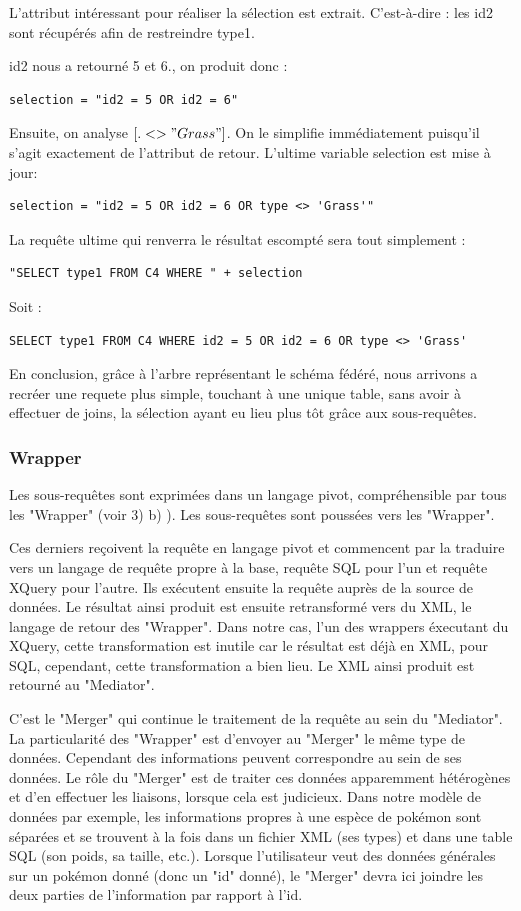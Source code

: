 L'attribut intéressant pour réaliser la sélection est extrait. C'est-à-dire : les id2 sont récupérés afin de restreindre type1.

id2 nous a retourné 5 et 6., on produit donc :
\begin{lstlisting}
selection = "id2 = 5 OR id2 = 6"
\end{lstlisting}

Ensuite, on analyse $[. <> "Grass"]$. On le simplifie immédiatement puisqu'il s'agit exactement de l'attribut de retour. L'ultime variable selection est mise à jour:
\begin{lstlisting}
selection = "id2 = 5 OR id2 = 6 OR type <> 'Grass'"
\end{lstlisting}
La requête ultime qui renverra le résultat escompté sera tout simplement :
\begin{lstlisting}
"SELECT type1 FROM C4 WHERE " + selection
\end{lstlisting}
Soit :
\begin{lstlisting}
SELECT type1 FROM C4 WHERE id2 = 5 OR id2 = 6 OR type <> 'Grass'
\end{lstlisting}
En conclusion, grâce à l'arbre représentant le schéma fédéré, nous arrivons a recréer une requete plus simple, touchant à une unique table,  sans avoir à effectuer de joins, la sélection ayant eu lieu plus tôt grâce aux sous-requêtes.

\subsubsection{Wrapper}

Les sous-requêtes sont exprimées dans un langage pivot, compréhensible par tous les "Wrapper" (voir 3) b) ). Les sous-requêtes sont poussées vers les "Wrapper".

Ces derniers reçoivent la requête en langage pivot et commencent par la traduire vers un langage de requête propre à la base, requête SQL pour l'un et requête XQuery pour l'autre. Ils exécutent ensuite la requête auprès de la source de données. Le résultat ainsi produit est ensuite retransformé vers du XML, le langage de retour des "Wrapper". Dans notre cas, l'un des wrappers éxecutant du XQuery, cette transformation est inutile car le résultat est déjà en XML, pour SQL, cependant, cette transformation a bien lieu. Le XML ainsi produit est retourné au "Mediator".

C'est le "Merger" qui continue le traitement de la requête au sein du "Mediator". La particularité des "Wrapper" est d'envoyer au "Merger" le même type de données. Cependant des informations peuvent correspondre au sein de ses données. Le rôle du "Merger" est de traiter ces données apparemment hétérogènes et d'en effectuer les liaisons, lorsque cela est judicieux. Dans notre modèle de données par exemple, les informations propres à une espèce de pokémon sont séparées et se trouvent à la fois dans un fichier XML (ses types) et dans une table SQL (son poids, sa taille, etc.). Lorsque l'utilisateur veut des données générales sur un pokémon donné (donc un "id" donné), le "Merger" devra ici joindre les deux parties de l'information par rapport à l'id. 


